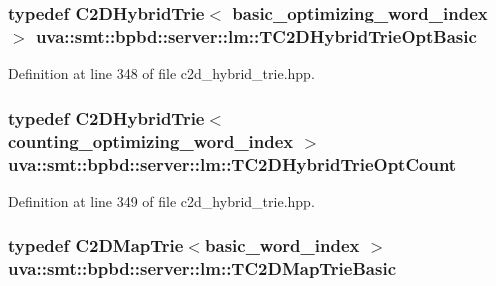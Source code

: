 \hypertarget{namespaceuva_1_1smt_1_1bpbd_1_1server_1_1lm_a3f81cdde0dc5ee7b07e41261e55d72de}{}
\subsubsection[{T\+C2\+D\+Hybrid\+Trie\+Opt\+Basic}]{\setlength{\rightskip}{0pt plus 5cm}typedef {\bf C2\+D\+Hybrid\+Trie}$<$ {\bf basic\+\_\+optimizing\+\_\+word\+\_\+index} $>$ {\bf uva\+::smt\+::bpbd\+::server\+::lm\+::\+T\+C2\+D\+Hybrid\+Trie\+Opt\+Basic}}\label{namespaceuva_1_1smt_1_1bpbd_1_1server_1_1lm_a3f81cdde0dc5ee7b07e41261e55d72de}


Definition at line 348 of file c2d\+\_\+hybrid\+\_\+trie.\+hpp.

\hypertarget{namespaceuva_1_1smt_1_1bpbd_1_1server_1_1lm_a4bdbd74a65273103a73e6d6ffca9cc17}{}
\subsubsection[{T\+C2\+D\+Hybrid\+Trie\+Opt\+Count}]{\setlength{\rightskip}{0pt plus 5cm}typedef {\bf C2\+D\+Hybrid\+Trie}$<$ {\bf counting\+\_\+optimizing\+\_\+word\+\_\+index} $>$ {\bf uva\+::smt\+::bpbd\+::server\+::lm\+::\+T\+C2\+D\+Hybrid\+Trie\+Opt\+Count}}\label{namespaceuva_1_1smt_1_1bpbd_1_1server_1_1lm_a4bdbd74a65273103a73e6d6ffca9cc17}


Definition at line 349 of file c2d\+\_\+hybrid\+\_\+trie.\+hpp.

\hypertarget{namespaceuva_1_1smt_1_1bpbd_1_1server_1_1lm_a8665d6a6541f00def10ad17f7afb70db}{}
\subsubsection[{T\+C2\+D\+Map\+Trie\+Basic}]{\setlength{\rightskip}{0pt plus 5cm}typedef {\bf C2\+D\+Map\+Trie}$<${\bf basic\+\_\+word\+\_\+index} $>$ {\bf uva\+::smt\+::bpbd\+::server\+::lm\+::\+T\+C2\+D\+Map\+Trie\+Basic}}\label{namespaceuva_1_1smt_1_1bpbd_1_1server_1_1lm_a8665d6a6541f00def10ad17f7afb70db}


